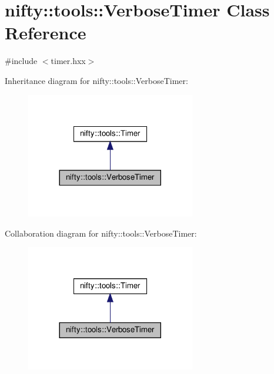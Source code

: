 \hypertarget{classnifty_1_1tools_1_1VerboseTimer}{}\section{nifty\+:\+:tools\+:\+:Verbose\+Timer Class Reference}
\label{classnifty_1_1tools_1_1VerboseTimer}


{\ttfamily \#include $<$timer.\+hxx$>$}



Inheritance diagram for nifty\+:\+:tools\+:\+:Verbose\+Timer\+:
\nopagebreak
\begin{figure}[H]
\begin{center}
\leavevmode
\includegraphics[width=209pt]{classnifty_1_1tools_1_1VerboseTimer__inherit__graph}
\end{center}
\end{figure}


Collaboration diagram for nifty\+:\+:tools\+:\+:Verbose\+Timer\+:
\nopagebreak
\begin{figure}[H]
\begin{center}
\leavevmode
\includegraphics[width=209pt]{classnifty_1_1tools_1_1VerboseTimer__coll__graph}
\end{center}
\end{figure}
